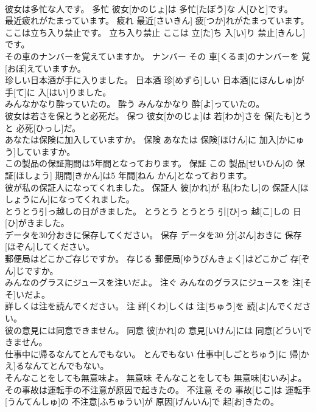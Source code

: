 \documentclass[8pt]{extreport}
\begin{document}
\begin{CJK}{UTF8}{min}
\\	彼女は多忙な人です。	多忙	彼女[かのじょ]は 多忙[たぼう]な 人[ひと]です。	
\\	最近疲れがたまっています。	疲れ	最近[さいきん] 疲[つか]れがたまっています。	
\\	ここは立ち入り禁止です。	立ち入り禁止	ここは 立[た]ち 入[い]り 禁止[きんし]です。	
\\	その車のナンバーを覚えていますか。	ナンバー	その 車[くるま]のナンバーを 覚[おぼ]えていますか。	
\\	珍しい日本酒が手に入りました。	日本酒	珍[めずら]しい 日本酒[にほんしゅ]が 手[て]に 入[はい]りました。	
\\	みんなかなり酔っていたの。	酔う	みんなかなり 酔[よ]っていたの。	
\\	彼女は若さを保とうと必死だ。	保つ	彼女[かのじょ]は 若[わか]さを 保[たも]とうと 必死[ひっし]だ。	
\\	あなたは保険に加入していますか。	保険	あなたは 保険[ほけん]に 加入[かにゅう]していますか。	
\\	この製品の保証期間は5年間となっております。	保証	この 製品[せいひん]の 保証[ほしょう] 期間[きかん]は5 年間[ねん かん]となっております。	
\\	彼が私の保証人になってくれました。	保証人	彼[かれ]が 私[わたし]の 保証人[ほしょうにん]になってくれました。	
\\	とうとう引っ越しの日がきました。	とうとう	とうとう 引[ひ]っ 越[こ]しの 日[ひ]がきました。	
\\	データを30分おきに保存してください。	保存	データを30 分[ぷん]おきに 保存[ほぞん]してください。	
\\	郵便局はどこかご存じですか。	存じる	郵便局[ゆうびんきょく]はどこかご 存[ぞん]じですか。	
\\	みんなのグラスにジュースを注いだよ。	注ぐ	みんなのグラスにジュースを 注[そそ]いだよ。	
\\	詳しくは注を読んでください。	注	詳[くわ]しくは 注[ちゅう]を 読[よ]んでください。	
\\	彼の意見には同意できません。	同意	彼[かれ]の 意見[いけん]には 同意[どうい]できません。	
\\	仕事中に帰るなんてとんでもない。	とんでもない	仕事中[しごとちゅう]に 帰[かえ]るなんてとんでもない。	
\\	そんなことをしても無意味よ。	無意味	そんなことをしても 無意味[むいみ]よ。	
\\	その事故は運転手の不注意が原因で起きたの。	不注意	その 事故[じこ]は 運転手[うんてんしゅ]の 不注意[ふちゅうい]が 原因[げんいん]で 起[お]きたの。	

\end{CJK}
\end{document}
